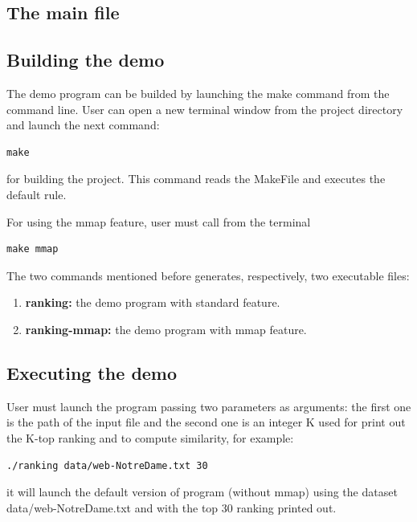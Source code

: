 \documentclass[10pt]{article}
\begin{document}
\subsection{The main file}

\subsection{Building the demo}
The demo program can be builded by launching the make command from the command line.
User can open a new terminal window from the project directory and launch the next command:
\begin{verbatim}make\end{verbatim}
for building the project. This command reads the MakeFile and executes the default rule.

For using the mmap feature, user must call from the terminal
\begin{verbatim}make mmap\end{verbatim}
The two commands mentioned before generates, respectively, two executable files:
\begin{enumerate}
    \item {\bf ranking:} the demo program with standard feature.
    \item {\bf ranking-mmap:} the demo program with mmap feature.
\end{enumerate}

\subsection{Executing the demo}
User must launch the program passing two parameters as arguments: the first one is the path of the input file and the second one is an integer K used for print out the K-top ranking and to compute similarity, for example:
\begin{verbatim}./ranking data/web-NotreDame.txt 30\end{verbatim}
it will launch the default version of program (without mmap) using the dataset data/web-NotreDame.txt and with the top 30 ranking printed out.
\end{document}
